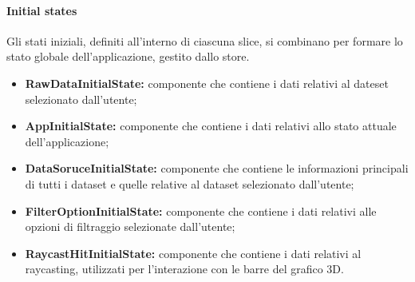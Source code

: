 \paragraph{Initial states}
    Gli stati iniziali, definiti all'interno di ciascuna slice, si combinano per formare lo stato globale dell'applicazione, gestito dallo store.
    \begin{itemize}
        \item \textbf{RawDataInitialState:} componente che contiene i dati relativi al dateset selezionato dall'utente;
        \item \textbf{AppInitialState:} componente che contiene i dati relativi allo stato attuale dell'applicazione;
        \item \textbf{DataSoruceInitialState:} componente che contiene le informazioni principali di tutti i dataset e quelle relative al dataset selezionato dall'utente;
        \item \textbf{FilterOptionInitialState:} componente che contiene i dati relativi alle opzioni di filtraggio selezionate dall'utente;
        \item \textbf{RaycastHitInitialState:} componente che contiene i dati relativi al raycasting, utilizzati per l'interazione con le barre del grafico 3D.
    \end{itemize}
